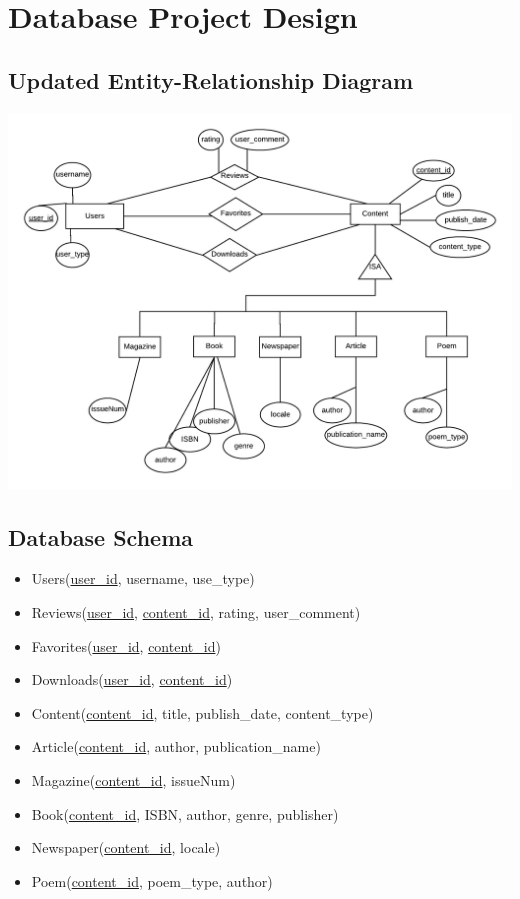 \documentclass[letter, 12pt, titlepage]{article}
\begin{document}

\section{Database Project Design}

\subsection{Updated Entity-Relationship Diagram}
\includegraphics[scale=1]{erd-rev.png}
\subsection{Database Schema}
\begin{itemize}
	\item Users(\underline{user\_id}, username, use\_type)
	\item Reviews(\underline{user\_id}, \underline{content\_id}, rating, user\_comment)
	\item Favorites(\underline{user\_id}, \underline{content\_id})
	\item Downloads(\underline{user\_id}, \underline{content\_id})
	\item Content(\underline{content\_id}, title, publish\_date, content\_type)
	\item Article(\underline{content\_id}, author, publication\_name)
	\item Magazine(\underline{content\_id}, issueNum)
	\item Book(\underline{content\_id}, ISBN, author, genre, publisher)
	\item Newspaper(\underline{content\_id}, locale)
	\item Poem(\underline{content\_id}, poem\_type, author)
\end{itemize}
\end{document}
